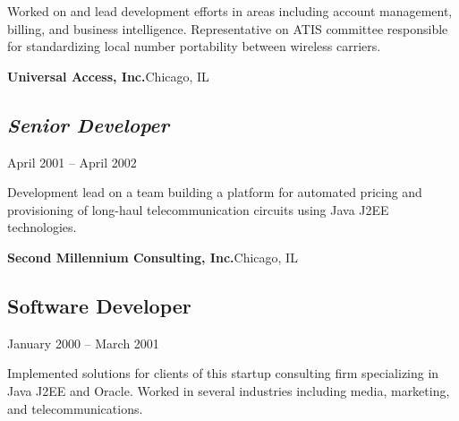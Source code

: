 {Worked on and lead development efforts in areas including account
management, billing, and business intelligence.  Representative on ATIS
committee responsible for standardizing local number portability between
wireless carriers.

\vskip 10pt

{\bf Universal Access, Inc.}\quad Chicago, IL

\subsection{\sl Senior Developer}
    {April 2001 -- April 2002}

Development lead on a team building a platform for automated pricing
and provisioning of long-haul telecommunication circuits using Java
J2EE technologies.

\vskip 10pt

{\bf Second Millennium Consulting, Inc.}\quad Chicago, IL

\subsection{Software Developer}
    {January 2000 -- March 2001}

Implemented solutions for clients of this startup consulting firm
specializing in Java J2EE and Oracle.  Worked in several industries
including media, marketing, and telecommunications.
}
\vfil\eject


